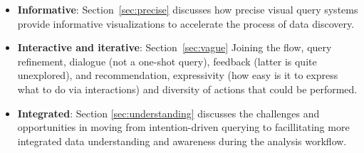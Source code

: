 \begin{itemize}
	\item \textbf{Informative}: Section~\ref{sec:precise} discusses how precise visual query systems provide informative visualizations to accelerate the process of data discovery. 
	\item \textbf{Interactive and iterative}: Section~\ref{sec:vague}
	Joining the flow, query refinement, dialogue (not a one-shot query), feedback (latter is quite unexplored), and recommendation, expressivity (how easy is it to express what to do via interactions) and diversity of actions that could be performed.

	\item \textbf{Integrated}: Section \ref{sec:understanding} discusses the challenges and opportunities in moving from intention-driven querying to facillitating more integrated data understanding and awareness during the analysis workflow.
\end{itemize}